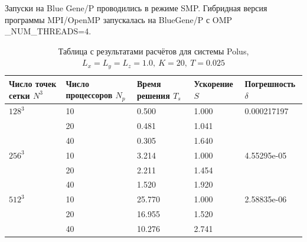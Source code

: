 \documentclass[oneside, final, 12pt]{extarticle}
\begin{document}
Запуски на Blue Gene/P проводились в режиме SMP.
Гибридная версия программы MPI/OpenMP запускалась на BlueGene/P с OMP \_NUM\_THREADS=4.

\begin{table}[H]
    \centering
    \begin{tabular}{|l|l|l|l|l|}
        \hline
        \makecell{Число точек \\сетки $ N^3 $} & \makecell{Число \\процессоров $ N_p $} & \makecell{Время \\решения $ T_s $} & Ускорение $ S $ & Погрешность $ \delta $ \\
        \hline
        $ 128^3 $                 & 10               & 0.500 & 1.000  & 0.000217197 \\
        \cline{2-4}
                              & 20               & 0.481 & 1.041  & \\
        \cline{2-4}
                              & 40              & 0.305 & 1.640 & \\
        \hline
        $ 256^3 $                 & 10               & 3.214 & 1.000  & 4.55295e-05 \\
        \cline{2-4}
                              & 20               & 2.211 & 1.454  & \\
        \cline{2-4}
                              & 40              & 1.520 & 1.920  & \\
        \hline
        $ 512^3 $                 & 10               & 25.770 & 1.000  & 2.58835e-06 \\
        \cline{2-4}
                              & 20               & 16.955 & 1.520 & \\
        \cline{2-4}
                              & 40              & 10.276 & 2.741 & \\
        \hline
    \end{tabular}
    \caption{Таблица с результатами расчётов для системы Polus, $ L_x = L_y = L_z = 1.0, \: K = 20, \: T = 0.025 $}
\end{table}
\end{document}
